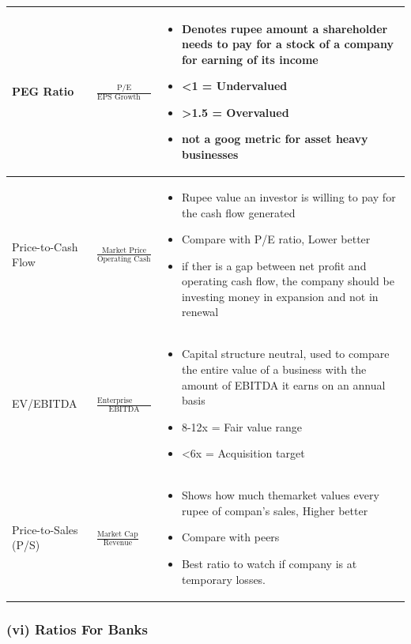 \documentclass[12pt]{article}
\begin{document}
\begin{longtable}{|>{\raggedright\arraybackslash}m{4.5cm}|>{\raggedright\arraybackslash}m{5cm}|>{\raggedright\arraybackslash}m{6cm}|}
PEG Ratio & 
$\frac{\text{P/E}}{\text{EPS Growth Rate}}$ &
\begin{itemize}
\item Denotes rupee amount a shareholder needs to pay for a stock of a company for earning \rupee 1 of its income
\item <1 = Undervalued
\item >1.5 = Overvalued
\item not a goog metric for asset heavy businesses
\end{itemize} \\
\hline

Price-to-Cash Flow & 
$\frac{\text{Market Price}}{\text{Operating Cash Flow/Share}}$ &
\begin{itemize}
\item Rupee value an investor is willing to pay for the cash flow generated
\item Compare with P/E ratio, Lower better
\item if ther is a gap between net profit and operating cash flow, the company should be investing money in expansion and not in renewal
\end{itemize} \\
\hline

EV/EBITDA & 
$\frac{\text{Enterprise Value}}{\text{EBITDA}}$ &
\begin{itemize}
\item Capital structure neutral, used to compare the entire value of a business with the amount of EBITDA it earns on an annual basis
\item 8-12x = Fair value range
\item <6x = Acquisition target
\end{itemize} \\
\hline

Price-to-Sales (P/S) & 
$\frac{\text{Market Cap}}{\text{Revenue}}$ &
\begin{itemize}
\item Shows how much themarket values every rupee of compan's sales, Higher better
\item Compare with peers
\item Best ratio to watch if company is at temporary losses.
\end{itemize} \\
\hline
\end{longtable}

\subsubsection*{(vi) Ratios For Banks}
\end{document}
